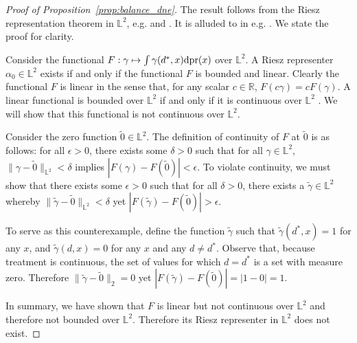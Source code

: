 \begin{proof}[Proof of Proposition~\ref{prop:balance_dne}]
The result follows from the Riesz representation theorem in $\mathbb{L}^2$, e.g. \cite[Theorem 5.3]{luenberger1997optimization} and \cite[Lemma 2.1]{chernozhukov2022debiased}. It is alluded to in e.g. \cite{van1991differentiable,newey1994asymptotic}. We state the proof for clarity.

Consider the functional $F:\gamma \mapsto \int \gamma(d^*,x)\mathrm{d}\text{\normalfont pr}(x)$ over $\mathbb{L}^2$. A Riesz representer $\alpha_0\in \mathbb{L}^2$ exists if and only if the functional $F$ is bounded and linear. Clearly the functional $F$ is linear in the sense that, for any scalar $c\in\mathbb{R}$, $F(c\gamma)=cF(\gamma)$. A linear functional is bounded over $\mathbb{L}^2$  if and only if it is continuous over $\mathbb{L}^2$ \cite[Proposition 5.1]{luenberger1997optimization}. We will show that this functional is not continuous over $\mathbb{L}^2$.

Consider the zero function $\tilde{0}\in \mathbb{L}^2$. The definition of continuity of $F$ at $\tilde{0}$ is as follows: for all $\epsilon>0$, there exists some $\delta>0$ such that for all $\gamma\in \mathbb{L}^2$, $\|\gamma-\tilde{0}\|_{\mathbb{L}^2}<\delta$ implies $|F(\gamma)-F(\tilde{0})|<\epsilon$. To violate continuity, we must show that there exists some $\epsilon>0$ such that for all $\delta>0$, there exists a $\tilde{\gamma}\in \mathbb{L}^2$ whereby $\|\tilde{\gamma}-\tilde{0}\|_{\mathbb{L}^2}<\delta$ yet $|F(\tilde{\gamma})-F(\tilde{0})|>\epsilon$.

To serve as this counterexample, define the function $\tilde{\gamma}$ such that $\tilde{\gamma}(d^*,x)=1$ for any $x$, and $\tilde{\gamma}(d,x)=0$ for any $x$ and any $d\neq d^*$. Observe that, because treatment is continuous, the set of values for which $d=d^*$ is a set with measure zero. Therefore $\|\tilde{\gamma}-\tilde{0}\|_2=0$ yet $|F(\tilde{\gamma})-F(\tilde{0})|=|1-0|=1$.

In summary, we have shown that $F$ is linear but not continuous over $\mathbb{L}^2$ and therefore not bounded over $\mathbb{L}^2$. Therefore its Riesz representer in $\mathbb{L}^2$ does not exist.
\end{proof}


